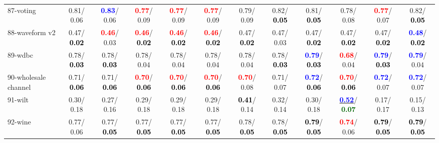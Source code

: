 \begin{table}[h]
\begin{center}
{\begin{tabular}{lc|c|c|c|c|c|c|c|c|c|c}
87-voting &   0.81/  0.06 & \textcolor{blue}{\textbf{  0.83}}/  0.06 & \textcolor{red}{\textbf{  0.77}}/  0.09 & \textcolor{red}{\textbf{  0.77}}/  0.09 & \textcolor{red}{\textbf{  0.77}}/  0.09 &   0.79/  0.09 &   0.82/\textcolor{black}{\textbf{  0.05}} &   0.81/\textcolor{black}{\textbf{  0.05}} &   0.78/  0.08 & \textcolor{red}{\textbf{  0.77}}/  0.07 &   0.82/\textcolor{black}{\textbf{  0.05}} \\
88-waveform v2 &   0.47/\textcolor{black}{\textbf{  0.02}} & \textcolor{red}{\textbf{  0.46}}/  0.03 & \textcolor{red}{\textbf{  0.46}}/\textcolor{black}{\textbf{  0.02}} & \textcolor{red}{\textbf{  0.46}}/\textcolor{black}{\textbf{  0.02}} & \textcolor{red}{\textbf{  0.46}}/\textcolor{black}{\textbf{  0.02}} &   0.47/\textcolor{black}{\textbf{  0.02}} &   0.47/  0.03 &   0.47/\textcolor{black}{\textbf{  0.02}} &   0.47/\textcolor{black}{\textbf{  0.02}} &   0.47/\textcolor{black}{\textbf{  0.02}} & \textcolor{blue}{\textbf{  0.48}}/\textcolor{black}{\textbf{  0.02}} \\
89-wdbc &   0.78/\textcolor{black}{\textbf{  0.03}} &   0.78/\textcolor{black}{\textbf{  0.03}} &   0.78/  0.04 &   0.78/  0.04 &   0.78/  0.04 &   0.78/  0.04 &   0.78/\textcolor{black}{\textbf{  0.03}} & \textcolor{blue}{\textbf{  0.79}}/\textcolor{black}{\textbf{  0.03}} & \textcolor{red}{\textbf{  0.68}}/  0.04 & \textcolor{blue}{\textbf{  0.79}}/\textcolor{black}{\textbf{  0.03}} & \textcolor{blue}{\textbf{  0.79}}/  0.04 \\
90-wholesale channel &   0.71/\textcolor{black}{\textbf{  0.06}} &   0.71/\textcolor{black}{\textbf{  0.06}} & \textcolor{red}{\textbf{  0.70}}/\textcolor{black}{\textbf{  0.06}} & \textcolor{red}{\textbf{  0.70}}/\textcolor{black}{\textbf{  0.06}} & \textcolor{red}{\textbf{  0.70}}/\textcolor{black}{\textbf{  0.06}} & \textcolor{red}{\textbf{  0.70}}/  0.08 &   0.71/  0.07 & \textcolor{blue}{\textbf{  0.72}}/\textcolor{black}{\textbf{  0.06}} & \textcolor{red}{\textbf{  0.70}}/\textcolor{black}{\textbf{  0.06}} & \textcolor{blue}{\textbf{  0.72}}/  0.07 & \textcolor{blue}{\textbf{  0.72}}/  0.07 \\
91-wilt &   0.30/  0.18 &   0.27/  0.16 &   0.29/  0.18 &   0.29/  0.18 &   0.29/  0.18 & \textcolor{black}{\textbf{  0.41}}/  0.14 &   0.32/  0.14 &   0.30/  0.18 & \underline{\textcolor{blue}{\textbf{  0.52}}}/\textcolor{darkgreen}{\textbf{  0.07}} &   0.17/  0.17 &   0.15/  0.13 \\
92-wine &   0.77/  0.06 &   0.77/\textcolor{black}{\textbf{  0.05}} &   0.77/\textcolor{black}{\textbf{  0.05}} &   0.77/\textcolor{black}{\textbf{  0.05}} &   0.77/\textcolor{black}{\textbf{  0.05}} &   0.78/\textcolor{black}{\textbf{  0.05}} &   0.78/\textcolor{black}{\textbf{  0.05}} & \textcolor{black}{\textbf{  0.79}}/\textcolor{black}{\textbf{  0.05}} & \textcolor{red}{\textbf{  0.74}}/  0.06 & \textcolor{black}{\textbf{  0.79}}/\textcolor{black}{\textbf{  0.05}} & \textcolor{black}{\textbf{  0.79}}/\textcolor{black}{\textbf{  0.05}} \\ \hline

\end{tabular}}
\end{center}
\end{table}

